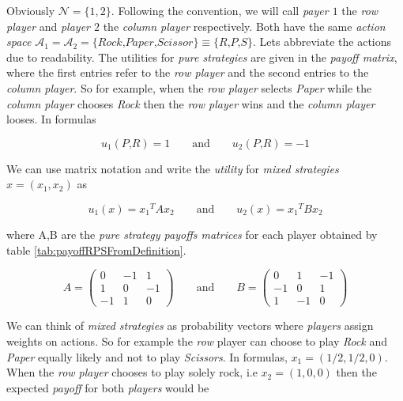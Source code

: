 Obviously $\mathcal{N} = \{1,2\}$. Following the convention, we will call \textit{payer $1$} the \textit{row player} and \textit{player $2$} the \textit{column player} respectively. Both have the same \textit{action space} $\mathcal{A}_1 = \mathcal{A}_2 = \{\textit{Rock,Paper,Scissor}\} \equiv \{\textit{R,P,S\}}$. Lets abbreviate the actions due to readability. The utilities for \textit{pure strategies} are given in the \textit{payoff matrix}, where the first entries refer to the \textit{row player} and the second entries to the \textit{column player}. So for example, when the \textit{row player} selects \textit{Paper} while the \textit{column player} chooses \textit{Rock} then the \textit{row player} wins and the \textit{column player} looses. In formulas

\begin{equation*}
    u_1(\textit{P,R}) = 1 \qquad \text{and} \qquad u_2(\textit{P,R}) = -1
\end{equation*}

We can use matrix notation and write the \textit{utility} for \textit{mixed strategies} $x = (x_1,x_2)$ as

\begin{equation*}
    u_1(x) = x{_1}^{T}Ax_2 \qquad \text{and} \qquad u_2(x) = x{_1}^{T}Bx_2
\end{equation*}

where A,B are the \textit{pure strategy payoffs matrices} for each player obtained by table \ref{tab:payoffRPSFromDefinition}.

\begin{equation*}
A = \begin{pmatrix}
0 & -1 & 1\\
1 & 0 & -1\\
-1 & 1 & 0
\end{pmatrix}
\qquad \text{and} \qquad
B = \begin{pmatrix}
0 & 1 & -1\\
-1 & 0 & 1\\
1 & -1 & 0
\end{pmatrix}
\end{equation*}

We can think of \textit{mixed strategies} as probability vectors where \textit{players} assign weights on actions. So for example the \textit{row} player can choose to play \textit{Rock} and \textit{Paper} equally likely and not to play \textit{Scissors}. In formulas, $x_1 = (1/2,1/2,0)$. When the \textit{row player} chooses to play solely rock, i.e $x_2 = (1,0,0)$ then the expected \textit{payoff} for both \textit{players} would be

